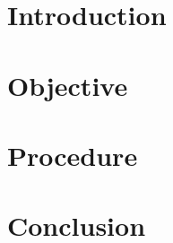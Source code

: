 \documentclass[a4paper,11pt]{report}
\begin{document}
	\author{}
	\title{}
	\maketitle
	 \tableofcontents \newpage {}

	\chapter{Introduction}
		\section{}
	\chapter{Objective}
		\section{}
	\chapter{Procedure}
		\section{}
	\chapter{Conclusion}
		\section{}
\end{document}
